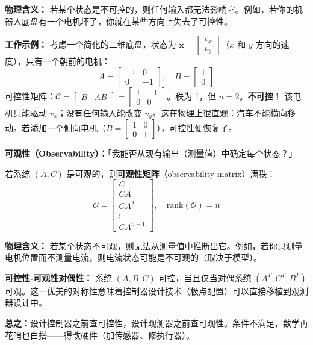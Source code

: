 \textbf{物理含义：} 若某个状态是不可控的，则任何输入都无法影响它。例如，若你的机器人底盘有一个电机坏了，你就在某些方向上失去了可控性。

\textbf{工作示例：} 考虑一个简化的二维底盘，状态为 $\mathbf{x} = \begin{bmatrix} v_x \\ v_y \end{bmatrix}$（$x$ 和 $y$ 方向的速度），只有一个朝前的电机：
\[
A = \begin{bmatrix} -1 & 0 \\ 0 & -1 \end{bmatrix}, \quad B = \begin{bmatrix} 1 \\ 0 \end{bmatrix}
\]
可控性矩阵：$\mathcal{C} = \begin{bmatrix} B & AB \end{bmatrix} = \begin{bmatrix} 1 & -1 \\ 0 & 0 \end{bmatrix}$。秩为 1，但 $n = 2$。\textbf{不可控！} 该电机只能驱动 $v_x$；没有任何输入能改变 $v_y$。这在物理上很直观：汽车不能横向移动。若添加一个侧向电机（$B = \begin{bmatrix} 1 & 0 \\ 0 & 1 \end{bmatrix}$），可控性便恢复了。

\textbf{可观性（Observability）：}「我能否从现有输出（测量值）中确定每个状态？」

若系统 $(A, C)$ 是可观的，则\textbf{可观性矩阵}（observability matrix）满秩：
\begin{equation}
\mathcal{O} = \begin{bmatrix} C \\ CA \\ CA^2 \\ \vdots \\ CA^{n-1} \end{bmatrix}, \quad \text{rank}(\mathcal{O}) = n
\end{equation}

\textbf{物理含义：} 若某个状态不可观，则无法从测量值中推断出它。例如，若你只测量电机位置而不测量电流，则电流状态可能是不可观的（取决于模型）。

\textbf{可控性-可观性对偶性：} 系统 $(A, B, C)$ 可控，当且仅当对偶系统 $(A^T, C^T, B^T)$ 可观。这一优美的对称性意味着控制器设计技术（极点配置）可以直接移植到观测器设计中。

\textbf{总之：}设计控制器之前查可控性，设计观测器之前查可观性。条件不满足，数学再花哨也白搭——得改硬件（加传感器、修执行器）。

